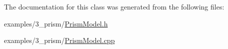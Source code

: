 The documentation for this class was generated from the following files\-:\begin{DoxyCompactItemize}
\item 
examples/3\-\_\-prism/\hyperlink{_prism_model_8h}{Prism\-Model.\-h}\item 
examples/3\-\_\-prism/\hyperlink{_prism_model_8cpp}{Prism\-Model.\-cpp}\end{DoxyCompactItemize}
